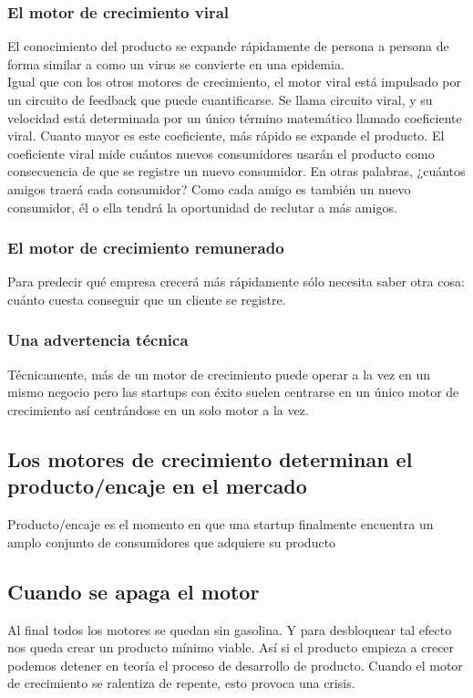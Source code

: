 \documentclass[10pt]{article}
\begin{document}
\begin{multicols}{2}
\subsubsection*{El motor de crecimiento viral}
El conocimiento del producto se expande rápidamente de persona a persona de forma similar a como un virus se convierte en una epidemia.\\
Igual que con los otros motores de crecimiento, el motor viral está impulsado por un circuito de feedback que puede cuantificarse. Se llama circuito viral, y su velocidad está determinada por un único término matemático llamado coeficiente viral. Cuanto mayor es este coeficiente, más rápido se expande el producto. El coeficiente viral mide cuántos nuevos consumidores usarán el producto como consecuencia de que se registre un nuevo consumidor. En otras palabras, ¿cuántos amigos traerá cada consumidor? Como cada amigo es también un nuevo consumidor, él o ella tendrá la oportunidad de reclutar a más amigos.
\subsubsection*{El motor de crecimiento remunerado}
{\color{blue}Para predecir qué empresa crecerá más rápidamente sólo necesita saber otra cosa: cuánto cuesta conseguir que un cliente se registre.}
\subsubsection*{Una advertencia técnica}
Técnicamente, más de un motor de crecimiento puede operar a la vez en un mismo negocio pero las startups con éxito suelen centrarse en un único motor de crecimiento así centrándose en un solo motor a la vez.
\subsection*{Los motores de crecimiento determinan el producto/encaje en el mercado}
{\color{blue}Producto/encaje es el momento en que una startup finalmente encuentra un amplo conjunto de consumidores que adquiere su producto}
\subsection*{Cuando se apaga el motor}
Al final todos los motores se quedan sin gasolina. Y para desbloquear tal efecto nos queda crear un producto mínimo viable. Así si el producto empieza a crecer podemos detener en teoría el proceso de desarrollo de producto. Cuando el motor de crecimiento  se ralentiza de repente, esto provoca una crisis.

\end{multicols}
\end{document}
